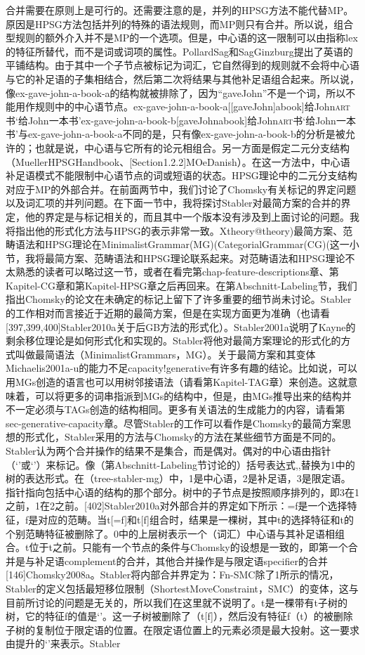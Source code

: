 合并需要在原则上是可行的。还需要注意的是，并列的HPSG方法不能代替MP。原因是HPSG方法包括并列的特殊的语法规则，而MP则只有合并。所以说，组合型规则的额外介入并不是MP的一个选项。但是，中心语的这一限制可以由指称lex的特征所替代，而不是词或词项的属性。PollardSag和SagGinzburg提出了英语的平铺结构。由于其中一个子节点被标记为词汇，它自然得到的规则就不会将中心语与它的补足语的子集相结合，然后第二次将结果与其他补足语组合起来。所以说，像ex-gave-john-a-book-a的结构就被排除了，因为“gaveJohn”不是一个词，所以不能用作规则中的中心语节点。ex-gave-john-a-book-a[[gaveJohn]abook]给John\textsc{art}书`给John一本书'ex-gave-john-a-book-b[gaveJohnabook]给John\textsc{art}书`给John一本书'与ex-gave-john-a-book-a不同的是，只有像ex-gave-john-a-book-b的分析是被允许的；也就是说，中心语与它所有的论元相组合。另一方面是假定二元分支结构（MuellerHPSGHandbook、[Section1.2.2]MOeDanish）。在这一方法中，中心语补足语模式不能限制中心语节点的词或短语的状态。HPSG理论中的二元分支结构对应于MP的外部合并。在前面两节中，我们讨论了Chomsky有关标记的界定问题以及词汇项的并列问题。在下面一节中，我将探讨Stabler对最简方案的合并的界定，他的界定是与标记相关的，而且其中一个版本没有涉及到上面讨论的问题。我将指出他的形式化方法与HPSG的表示非常一致。Xtheory@theory)最简方案、范畴语法和HPSG理论在MinimalistGrammar(MG)(CategorialGrammar(CG)(这一小节，我将最简方案、范畴语法和HPSG理论联系起来。对范畴语法和HPSG理论不太熟悉的读者可以略过这一节，或者在看完第chap-feature-descriptions章、第Kapitel-CG章和第Kapitel-HPSG章之后再回来。在第Abschnitt-Labeling节，我们指出Chomsky的论文在未确定的标记上留下了许多重要的细节尚未讨论。Stabler的工作相对而言接近于近期的最简方案，但是在实现方面更为准确（也请看[397,399,400]Stabler2010a关于后GB方法的形式化）。Stabler2001a说明了Kayne的剩余移位理论是如何形式化和实现的。Stabler将他对最简方案理论的形式化的方式叫做最简语法（MinimalistGrammars，MG）。关于最简方案和其变体Michaelis2001a-u的能力不足capacity!generative有许多有趣的结论。比如说，可以用MGs创造的语言也可以用树邻接语法（请看第Kapitel-TAG章）来创造。这就意味着，可以将更多的词串指派到MGs的结构中，但是，由MGs推导出来的结构并不一定必须与TAGs创造的结构相同。更多有关语法的生成能力的内容，请看第sec-generative-capacity章。尽管Stabler的工作可以看作是Chomsky的最简方案思想的形式化，Stabler采用的方法与Chomsky的方法在某些细节方面是不同的。Stabler认为两个合并操作的结果不是集合，而是偶对。偶对的中心语由指针（`'或`'）来标记。像（第Abschnitt-Labeling节讨论的）括号表达式,,替换为1中的树的表达形式。在（tree-stabler-mg）中，1是中心语，2是补足语，3是限定语。指针指向包括中心语的结构的那个部分。树中的子节点是按照顺序排列的，即3在1之前，1在2之前。[402]Stabler2010a对外部合并的界定如下所示：=f是一个选择特征，f是对应的范畴。当t[=f]和t[f]组合时，结果是一棵树，其中t的选择特征和t的个别范畴特征被删除了。0中的上层树表示一个（词汇）中心语与其补足语相组合。t位于t之前。只能有一个节点的条件与Chomsky的设想是一致的，即第一个合并是与补足语complement的合并，其他合并操作是与限定语specifier的合并[146]Chomsky2008a。Stabler将内部合并界定为：Fn-SMC除了1所示的情况，Stabler的定义包括最短移位限制（ShortestMoveConstraint，SMC）的变体，这与目前所讨论的问题是无关的，所以我们在这里就不说明了。t是一棵带有t子树的树，它的特征f的值是`'。这一子树被删除了（t[f]），然后没有特征f（t）的被删除子树的复制位于限定语的位置。在限定语位置上的元素必须是最大投射。这一要求由提升的`'来表示。Stabler